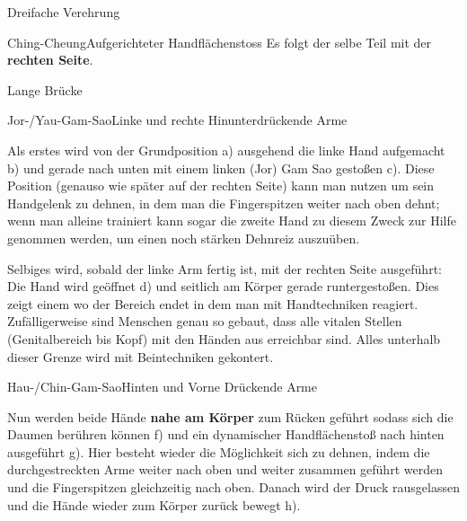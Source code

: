 \begin{WTSatz}{Dreifache Verehrung}
\begin{WTSatzTeil}{Ching-Cheung}{Aufgerichteter Handfl\"achenstoss}
		Es folgt der selbe Teil mit der \textbf{rechten Seite}.
		
	\end{WTSatzTeil}
	
\end{WTSatz}


\begin{WTSatz}{Lange Br\"ucke}%

	
	\begin{WTSatzTeil}{Jor-/Yau-Gam-Sao}{Linke und rechte Hinunterdr\"uckende Arme}
		
		Als erstes wird von der Grundposition a) ausgehend die linke Hand aufgemacht b) und gerade nach unten mit einem linken (Jor) Gam Sao gesto{\ss}en c). Diese Position (genauso wie sp\"ater auf der rechten Seite) kann man nutzen um sein Handgelenk zu dehnen, in dem man die Fingerspitzen weiter nach oben dehnt; wenn man alleine trainiert kann sogar die zweite Hand zu diesem Zweck zur Hilfe genommen werden, um einen noch st\"arken Dehnreiz auszu\"uben.
		
		
		Selbiges wird, sobald der linke Arm fertig ist, mit der rechten Seite ausgef\"uhrt: Die Hand wird ge\"offnet d) und seitlich am K\"orper gerade runtergesto{\ss}en. Dies zeigt einem wo der Bereich endet in dem man mit Handtechniken reagiert. Zuf\"alligerweise sind Menschen genau so gebaut, dass alle vitalen Stellen (Genitalbereich bis Kopf) mit den H\"anden aus erreichbar sind. Alles unterhalb dieser Grenze wird mit Beintechniken gekontert.
		
	\end{WTSatzTeil}
	\begin{WTSatzTeil}{Hau-/Chin-Gam-Sao}{Hinten und Vorne Dr\"uckende Arme}
		
		Nun werden beide H\"ande \textbf{nahe am K\"orper} zum R\"ucken gef\"uhrt sodass sich die Daumen ber\"uhren k\"onnen f) und ein dynamischer Handfl\"achensto{\ss} nach hinten ausgef\"uhrt g). Hier besteht wieder die M\"oglichkeit sich zu dehnen, indem die durchgestreckten Arme weiter nach oben und weiter zusammen gef\"uhrt werden und die Fingerspitzen gleichzeitig nach oben. Danach wird der Druck rausgelassen und die H\"ande wieder zum K\"orper zur\"uck bewegt h).
		

\end{WTSatzTeil}
\end{WTSatz}
